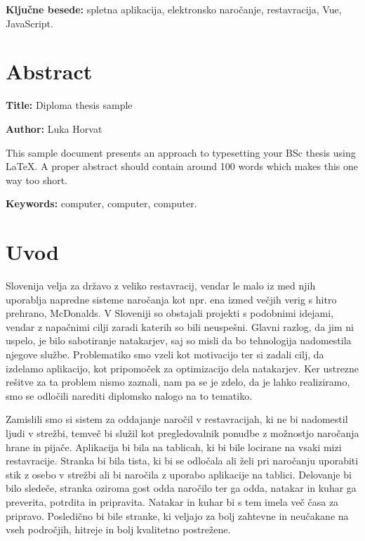 \documentclass[a4paper, 12pt]{book}
\newcommand{\ttitleEn}{Diploma thesis sample}
\newcommand{\tauthor}{Luka Horvat}
\newcommand{\tkeywords}{spletna aplikacija, elektronsko naročanje, restavracija, Vue, JavaScript}
\newcommand{\tkeywordsEn}{computer, computer, computer}
\newcommand{\clearemptydoublepage}{\newpage{\pagestyle{empty}\cleardoublepage}}
\begin{document}
\noindent\textbf{Ključne besede:} \tkeywords.
\clearemptydoublepage

\chapter*{Abstract}

\noindent\textbf{Title:} \ttitleEn
\bigskip

\noindent\textbf{Author:} \tauthor
\bigskip

\noindent This sample document presents an approach to typesetting your BSc thesis using \LaTeX. 
A proper abstract should contain around 100 words which makes this one way too short.
\bigskip

\noindent\textbf{Keywords:} \tkeywordsEn.
\clearemptydoublepage

\mainmatter
\setcounter{page}{1}
\pagestyle{fancy}
 
\chapter{Uvod}
Slovenija velja za državo z veliko restavracij, vendar le malo iz med njih uporablja napredne sisteme naročanja kot npr. ena izmed večjih verig s hitro prehrano, McDonalds. V Sloveniji so obstajali projekti s podobnimi idejami, vendar z napačnimi cilji zaradi katerih so bili neuspešni. Glavni razlog, da jim ni uspelo, je bilo sabotiranje natakarjev, saj so misli da bo tehnologija nadomestila njegove službe. Problematiko smo vzeli kot motivacijo ter si zadali cilj, da izdelamo aplikacijo, kot pripomoček za optimizacijo dela natakarjev. Ker ustrezne rešitve za ta problem nismo zaznali, nam pa se je zdelo, da je lahko realiziramo, smo se odločili narediti diplomsko nalogo na to tematiko.

Zamislili smo si sistem za oddajanje naročil v restavracijah, ki ne bi nadomestil ljudi v strežbi, temveč bi služil kot pregledovalnik ponudbe z možnostjo naročanja hrane in pijače. Aplikacija bi bila na tablicah, ki bi bile locirane na vsaki mizi restavracije. Stranka bi bila tista, ki bi se odločala ali želi pri naročanju uporabiti stik z osebo v strežbi ali bi naročila z uporabo aplikacije na tablici. Delovanje bi bilo sledeče, stranka oziroma gost odda naročilo ter ga odda, natakar in kuhar ga preverita, potrdita in pripravita.  Natakar in kuhar bi s tem imela več časa za pripravo. Posledično bi bile stranke, ki veljajo za bolj zahtevne in neučakane na vseh področjih, hitreje in bolj kvalitetno postrežene. 
\end{document}
